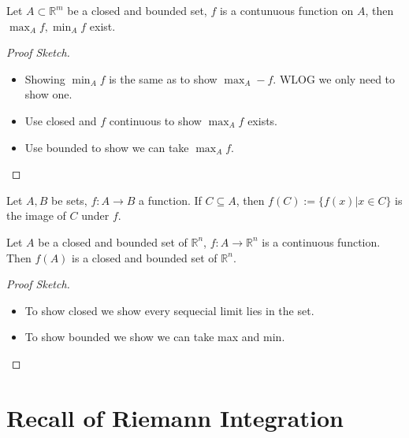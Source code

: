 \documentclass[11pt]{article}
\begin{document}
\begin{proposition}[ ]
Let \(A \subset \mathbb{R}^{m}\) be a closed and bounded set, \(f\) is a contunuous function on \(A\), then \(\max_A f, \min_A f\) exist.
\end{proposition}

\begin{proof}[Proof Sketch]
\leavevmode
\begin{itemize}
\item Showing \(\min_A f\) is the same as to show \(\max_A -f\). WLOG we only need to show one.
\item Use closed and \(f\) continuous to show \(\max_A f\) exists.
\item Use bounded to show we can take \(\max_A f\).
\end{itemize}
\end{proof}

\begin{definition}[Image]
Let \(A, B\) be sets, \(f:A\to B\) a function. If \(C \subseteq A\), then \(f(C) := \{f(x) \vert x \in C\}\) is the image of \(C\) under \(f\).
\end{definition}

\begin{proposition}
Let \(A\) be a closed and bounded set of \(\mathbb{R}^{n}\), \(f: A \to \mathbb{R}^{n}\) is a continuous function. Then \(f(A)\) is a closed and bounded set of \(\mathbb{R}^{n}\).
\end{proposition}

\begin{proof}[Proof Sketch]
\leavevmode
\begin{itemize}
\item To show closed we show every sequecial limit lies in the set.
\item To show bounded we show we can take max and min.
\end{itemize}
\end{proof}
\section{Recall of Riemann Integration}
\label{sec:orgdf228c8}
\end{document}
